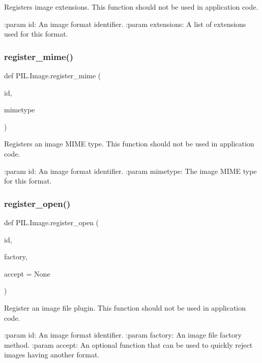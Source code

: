 \begin{DoxyVerb}Registers image extensions.  This function should not be
used in application code.

:param id: An image format identifier.
:param extensions: A list of extensions used for this format.
\end{DoxyVerb}
 \mbox{\label{namespacePIL_1_1Image_aecc3873ff9815428fc61904b5c50ff18}} 
\subsubsection{\texorpdfstring{register\+\_\+mime()}{register\_mime()}}
{\footnotesize\ttfamily def P\+I\+L.\+Image.\+register\+\_\+mime (\begin{DoxyParamCaption}\item[{}]{id,  }\item[{}]{mimetype }\end{DoxyParamCaption})}

\begin{DoxyVerb}Registers an image MIME type.  This function should not be used
in application code.

:param id: An image format identifier.
:param mimetype: The image MIME type for this format.
\end{DoxyVerb}
 \mbox{\label{namespacePIL_1_1Image_ae5cb271c5ca44d8fabecf6826ca32c1d}} 
\subsubsection{\texorpdfstring{register\+\_\+open()}{register\_open()}}
{\footnotesize\ttfamily def P\+I\+L.\+Image.\+register\+\_\+open (\begin{DoxyParamCaption}\item[{}]{id,  }\item[{}]{factory,  }\item[{}]{accept = {\ttfamily None} }\end{DoxyParamCaption})}

\begin{DoxyVerb}Register an image file plugin.  This function should not be used
in application code.

:param id: An image format identifier.
:param factory: An image file factory method.
:param accept: An optional function that can be used to quickly
   reject images having another format.
\end{DoxyVerb}
 \mbox{\label{namespacePIL_1_1Image_aed6ee26fb447b555278105ae5aac0969}} 
